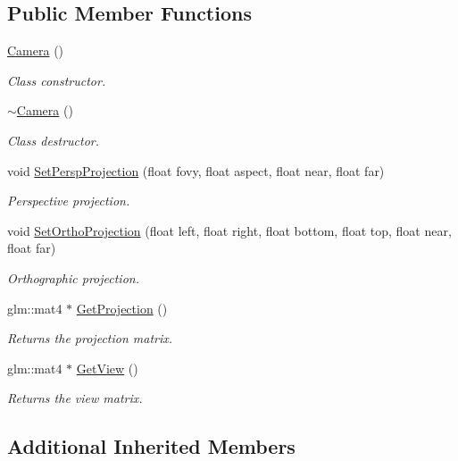 \subsection*{Public Member Functions}
\begin{DoxyCompactItemize}
\item 
\hyperlink{class_camera_a01f94c3543f56ede7af49dc778f19331}{Camera} ()
\begin{DoxyCompactList}\small\item\em Class constructor. \end{DoxyCompactList}\item 
\hyperlink{class_camera_ad1897942d0ccf91052386388a497349f}{$\sim$\+Camera} ()
\begin{DoxyCompactList}\small\item\em Class destructor. \end{DoxyCompactList}\item 
void \hyperlink{class_camera_ab8bb3c4e5dd304753fc6a2937175d1d9}{Set\+Persp\+Projection} (float fovy, float aspect, float near, float far)
\begin{DoxyCompactList}\small\item\em Perspective projection. \end{DoxyCompactList}\item 
void \hyperlink{class_camera_aaee3d9ca2a77a31574da1e927047af84}{Set\+Ortho\+Projection} (float left, float right, float bottom, float top, float near, float far)
\begin{DoxyCompactList}\small\item\em Orthographic projection. \end{DoxyCompactList}\item 
glm\+::mat4 $\ast$ \hyperlink{class_camera_a0a515e9b67a4f4f9d012209431e45448}{Get\+Projection} ()
\begin{DoxyCompactList}\small\item\em Returns the projection matrix. \end{DoxyCompactList}\item 
glm\+::mat4 $\ast$ \hyperlink{class_camera_a7a1951025a21533f97f06071df681f7b}{Get\+View} ()
\begin{DoxyCompactList}\small\item\em Returns the view matrix. \end{DoxyCompactList}\end{DoxyCompactItemize}
\subsection*{Additional Inherited Members}


